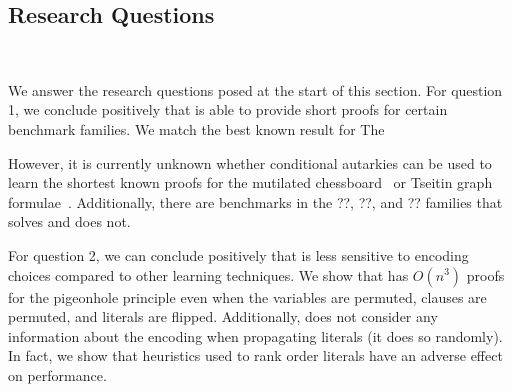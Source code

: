 \subsection{Research Questions}~\label{subsec:eval-research-questions}

We answer the research questions posed at the start of this section. For
question 1, we conclude positively that \tool is able to provide short \pr
proofs for certain benchmark families. We match the best known result for The

However, it is currently unknown whether conditional autarkies can be used to
learn the shortest known \pr proofs for the mutilated
chessboard~\cite{mutilatedchessboard-pr} or Tseitin graph
formulae~\cite{sadical}. Additionally, there are benchmarks in the ??, ??, and
?? families that \prelearn solves and \tool does not.

For question 2, we can conclude positively that \tool is less sensitive to
encoding choices compared to other \pr learning techniques. We show that \tool
has $O(n^3)$ proofs for the pigeonhole principle even when the variables are
permuted, clauses are permuted, and literals are flipped. Additionally, \tool
does not consider any information about the encoding when propagating literals
(it does so randomly). In fact, we show that heuristics used to rank order
literals have an adverse effect on performance.
